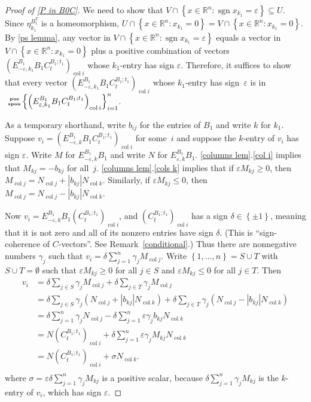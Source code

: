 \documentclass{amsart}
\theoremstyle{definition}
\theoremstyle{remark}
\numberwithin{equation}{section}
\newcommand{\reals}{\mathbb R}
\newcommand{\ep}{\varepsilon}
\newcommand{\col}{\operatorname{col}}
\newcommand{\sgn}{\operatorname{sgn}}
\newcommand{\posspan}{\!\tiny\begin{array}{c}\mathbf{pos}\\\mathbf{span}\end{array}\!\!}
\newcommand{\set}[1]{{\left\lbrace #1 \right\rbrace}}
\newcommand{\0}{{\mathbf{0}}}
\begin{document}
\begin{proof}[Proof of \cref{P in B0C}]
We need to show that $V\cap\set{x\in\reals^n:\sgn x_{k_1}=\ep}\subseteq U$.
Since $\eta_{k_1}^{B_1^T}$ is a homeomorphism, $U\cap\set{x\in\reals^n:x_{k_1}=0}=V\cap\set{x\in\reals^n:x_{k_1}=0}$.
By \cref{ps lemma}, any vector in $V\cap\set{x\in\reals^n:\sgn x_{k_1}=\ep}$ equals a vector in $V\cap\set{x\in\reals^n:x_{k_1}=0}$ plus a positive combination of vectors $\left(E^{B_1}_{-\ep,k_1}B_1C_t^{B_1;t_1}\right)_{\col i}$ whose $k_1$-entry has sign $\ep$.
Therefore, it suffices to show that every vector $\left(E^{B_1}_{-\ep,k_1}B_1C_t^{B_1;t_1}\right)_{\col i}$ whose $k_1$-entry has sign~$\ep$ is in $\posspan\set{\left(E^{B_1}_{\ep,k_1}B_1C_t^{B_1;t_1}\right)_{\col i}}_{i=1}^n$.

As a temporary shorthand, write $b_{ij}$ for the entries of $B_1$ and write $k$ for $k_1$.
Suppose $v_i=\left(E^{B_1}_{-\ep,k}B_1C_t^{B_1;t_1}\right)_{\col i}$ for some~$i$ and suppose the $k$-entry of $v_i$ has sign $\ep$.
Write $M$ for $E^{B_1}_{-\ep,k}B_1$ and write $N$ for $E^{B_1}_{\ep,k}B_1$.
\cref{columns lem}.\ref{col i} implies that $M_{kj}=-b_{kj}$ for all~$j$.
\cref{columns lem}.\ref{cols k} implies that if $\ep M_{kj}\ge0$, then $M_{\col j}=N_{\col j}+|b_{kj}|N_{\col k}$.
Similarly, if $\ep M_{kj}\le0$, then $M_{\col j}=N_{\col j}-|b_{kj}|N_{\col k}$.

Now $v_i=E^{B_1}_{-\ep,k}B_1\left(C_t^{B_1;t_1}\right)_{\col i}$, and $\left(C_t^{B_1;t_1}\right)_{\col i}$ has a sign $\delta\in\set{\pm1}$, meaning that it is not zero and all of its nonzero entries have sign $\delta$.
(This is ``sign-coherence of $C$-vectors''.  
See Remark~\ref{conditional}.)
Thus there are nonnegative numbers $\gamma_j$ such that $v_i=\delta\sum_{j=1}^n\gamma_jM_{\col j}$.
Write $\set{1,\ldots,n}=S\cup T$ with $S\cup T=\emptyset$ such that $\ep M_{kj}\ge0$ for all $j\in S$ and $\ep M_{kj}\le0$ for all $j\in T$.
Then
\begin{align*}
v_i
&=\delta\sum_{j\in S}\gamma_jM_{\col j}+\delta\sum_{j\in T}\gamma_jM_{\col j}\\
&=\delta\sum_{j\in S}\gamma_j(N_{\col j}+|b_{kj}|N_{\col k})+\delta\sum_{j\in T}\gamma_j(N_{\col j}-|b_{kj}|N_{\col k})\\
&=\delta\sum_{j=1}^n\gamma_jN_{\col j}-\delta\sum_{j=1}^n\ep\gamma_jb_{kj}N_{\col k}\\
&=N\left(C_t^{B_1;t_1}\right)_{\col i}+\delta\sum_{j=1}^n\ep\gamma_jM_{kj}N_{\col k}\\
&=N\left(C_t^{B_1;t_1}\right)_{\col i}+\sigma N_{\col k}.\\
\end{align*}
where $\sigma=\ep\delta\sum_{j=1}^n\gamma_jM_{kj}$ is a positive scalar, because $\delta\sum_{j=1}^n\gamma_jM_{kj}$ is the $k$-entry of $v_i$, which has sign $\ep$.


\end{proof}
\end{document}
